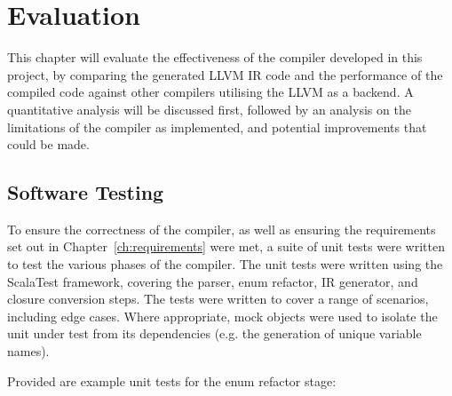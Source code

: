 \chapter{Evaluation}
\label{ch:evaluation}

This chapter will evaluate the effectiveness of the compiler developed in this project, by comparing
the generated LLVM IR code and the performance of the compiled code against other compilers
utilising the LLVM as a backend. A quantitative analysis will be discussed first, followed by an
analysis on the limitations of the compiler as implemented, and potential improvements that could be
made.

\section{Software Testing}

To ensure the correctness of the compiler, as well as ensuring the requirements set out in
Chapter~\ref{ch:requirements} were met, a suite of unit tests were written to test the various
phases of the compiler. The unit tests were written using the ScalaTest framework, covering the
parser, enum refactor, IR generator, and closure conversion steps. The tests were written to cover a
range of scenarios, including edge cases. Where appropriate, mock objects were used to isolate the
unit under test from its dependencies (e.g. the generation of unique variable names).

Provided are example unit tests for the enum refactor stage:

